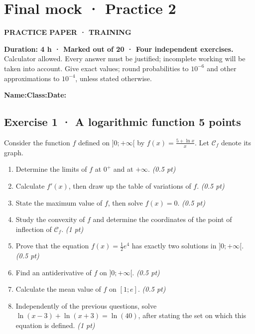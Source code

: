 \fi

\clearpage{}\label{sujet:9-2}

\section*{Final mock · Practice 2}

{\sffamily\bfseries\color{teal}PRACTICE PAPER · TRAINING\par}

\textbf{Duration: 4 h · Marked out of 20 · Four independent exercises.}\\Calculator allowed. Every answer must be justified; incomplete working will be taken into account. Give exact values; round probabilities to $10^{-6}$ and other approximations to $10^{-4}$, unless stated otherwise.

\smallskip\textbf{Name:}\enspace\dotfill\quad\textbf{Class:}\enspace\dotfill\quad\textbf{Date:}\enspace\dotfill

\subsection*{Exercise 1 · A logarithmic function \hfill 5 points}Consider the function $f$ defined on $]0;+\infty[$ by $f(x)=\frac{5+\ln x}x$. Let $\mathcal C_f$ denote its graph.

\begin{enumerate}

\item Determine the limits of $f$ at $0^+$ and at $+\infty$. \hfill\textit{(0.5 pt)}

\item Calculate $f' (x)$, then draw up the table of variations of $f$. \hfill\textit{(0.5 pt)}

\item State the maximum value of $f$, then solve $f(x)=0$. \hfill\textit{(0.5 pt)}

\item Study the convexity of $f$ and determine the coordinates of the point of inflection of $\mathcal C_f$. \hfill\textit{(1 pt)}

\item Prove that the equation $f(x)=\frac12 e^{4}$ has exactly two solutions in $]0;+\infty[$. \hfill\textit{(0.5 pt)}

\item Find an antiderivative of $f$ on $]0;+\infty[$. \hfill\textit{(0.5 pt)}

\item Calculate the mean value of $f$ on $[1;e]$. \hfill\textit{(0.5 pt)}

\item Independently of the previous questions, solve $\ln(x-3)+\ln(x+3)=\ln(40)$, after stating the set on which this equation is defined. \hfill\textit{(1 pt)}

\end{enumerate}

